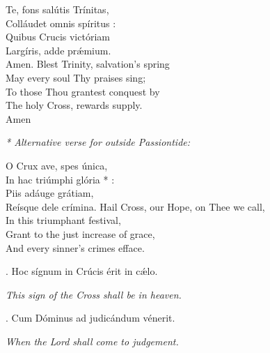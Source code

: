 Te, fons salútis Trínitas,\\
Colláudet omnis spíritus :\\
Quibus Crucis victóriam\\
Largíris, adde prǽmium.\\
Amen.
\divverse
Blest Trinity, salvation’s spring\\
May every soul Thy praises sing;\\
To those Thou grantest conquest by\\
The holy Cross, rewards supply.\\
Amen
\finishverse

\eject

\emph{* Alternative verse for outside Passiontide:}

O Crux ave, spes única,\\
In hac triúmphi glória * :\\
Piis adáuge grátiam,\\
Reísque dele crímina.
\divverse
Hail Cross, our Hope, on Thee we call,\\
In this triumphant festival,\\
Grant to the just increase of grace,\\
And every sinner’s crimes efface.
\finishverse
\bigskip

\hskip2cm\begin{minipage}{7cm}
\Vbar. Hoc sígnum in Crúcis érit in cǽlo.

\phantom{big tab}\emph{This sign of the Cross shall be in heaven.}

\Rbar. Cum Dóminus ad judicándum vénerit.

\phantom{big tab}\emph{When the Lord shall come to judgement.}
\end{minipage}

\bigskip


\setlength{\preverseskip}{10pt}
